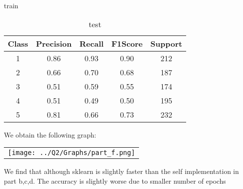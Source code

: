 \begin{enumerate}[label=(\alph*)]
\begin{enumerate}[label=\roman*.]
\begin{table}[!htb]
            \caption{train}
            \label{part f train depth 4}
        \end{table}
        \begin{table}[!htb]
            \centering
            \begin{tabular}{ccccc}
            \hline
            Class & Precision & Recall & F1Score & Support \\ \hline
            1     & 0.86      & 0.93   & 0.90    & 212     \\
            2     & 0.66      & 0.70   & 0.68    & 187     \\
            3     & 0.51      & 0.59   & 0.55    & 174     \\
            4     & 0.51      & 0.49   & 0.50    & 195     \\
            5     & 0.81      & 0.66   & 0.73    & 232     \\ \hline
            \end{tabular}
            \caption{test}
            \label{part f test depth 4}
        \end{table}
        \newpage
        

    \end{enumerate}
    We obtain the following graph:
    \begin{center}
        \begin{tabular}{c}
            \texttt{[image: ../Q2/Graphs/part\_f.png]}
        \end{tabular}
    \end{center}
    We find that although sklearn is slightly faster than the self implementation in part b,c,d. The accuracy is slightly worse due to smaller number of epochs

\end{enumerate}


